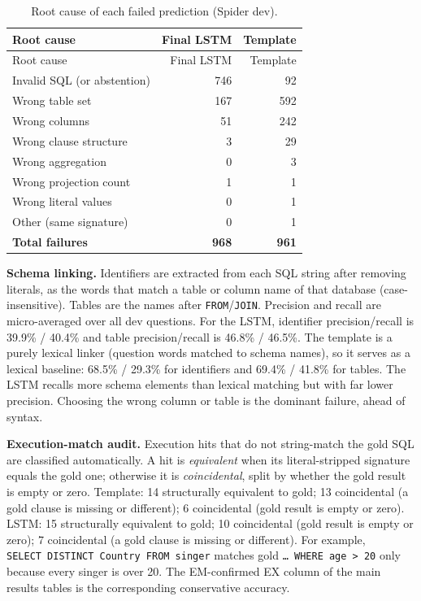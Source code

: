\documentclass[
  10pt,
]{article}
\begin{document}
\begin{longtable}[]{@{}lrr@{}}
\caption{Root cause of each failed prediction (Spider
dev).}\tabularnewline
\toprule\noalign{}
Root cause & Final LSTM & Template \\
\midrule\noalign{}
\endfirsthead
\toprule\noalign{}
Root cause & Final LSTM & Template \\
\midrule\noalign{}
\endhead
\bottomrule\noalign{}
\endlastfoot
Invalid SQL (or abstention) & 746 & 92 \\
Wrong table set & 167 & 592 \\
Wrong columns & 51 & 242 \\
Wrong clause structure & 3 & 29 \\
Wrong aggregation & 0 & 3 \\
Wrong projection count & 1 & 1 \\
Wrong literal values & 0 & 1 \\
Other (same signature) & 0 & 1 \\
\textbf{Total failures} & \textbf{968} & \textbf{961} \\
\end{longtable}

\textbf{Schema linking.} Identifiers are extracted from each SQL string
after removing literals, as the words that match a table or column name
of that database (case-insensitive). Tables are the names after
\texttt{FROM}/\texttt{JOIN}. Precision and recall are micro-averaged
over all dev questions. For the LSTM, identifier precision/recall is
39.9\% / 40.4\% and table precision/recall is 46.8\% / 46.5\%. The
template is a purely lexical linker (question words matched to schema
names), so it serves as a lexical baseline: 68.5\% / 29.3\% for
identifiers and 69.4\% / 41.8\% for tables. The LSTM recalls more schema
elements than lexical matching but with far lower precision. Choosing
the wrong column or table is the dominant failure, ahead of syntax.

\textbf{Execution-match audit.} Execution hits that do not string-match
the gold SQL are classified automatically. A hit is \emph{equivalent}
when its literal-stripped signature equals the gold one; otherwise it is
\emph{coincidental}, split by whether the gold result is empty or zero.
Template: 14 structurally equivalent to gold; 13 coincidental (a gold
clause is missing or different); 6 coincidental (gold result is empty or
zero). LSTM: 15 structurally equivalent to gold; 10 coincidental (gold
result is empty or zero); 7 coincidental (a gold clause is missing or
different). For example,
\texttt{SELECT\ DISTINCT\ Country\ FROM\ singer} matches gold
\texttt{…\ WHERE\ age\ \textgreater{}\ 20} only because every singer is
over 20. The EM-confirmed EX column of the main results tables is the
corresponding conservative accuracy.
\end{document}
